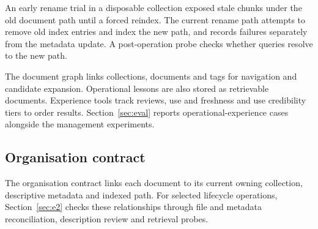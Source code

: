 An early rename trial in a disposable collection exposed stale chunks
under the old document path until a forced reindex. The current rename
path attempts to remove old index
entries and index the new path, and records failures separately from the
metadata update. A post-operation probe checks whether queries resolve to
the new path.

The document graph links collections, documents and tags for navigation and
candidate expansion. Operational lessons are also stored as retrievable
documents. Experience tools track reviews, use and freshness and use
credibility tiers to order results. Section~\ref{sec:eval} reports
operational-experience cases alongside the management experiments.

\subsection{Organisation contract}
\label{sec:org-integrity}
\label{sec:org-summary}

The organisation contract links each document to its current owning
collection, descriptive metadata and indexed path. For selected lifecycle
operations, Section~\ref{sec:e2} checks these relationships through file
and metadata reconciliation, description review and retrieval probes.
